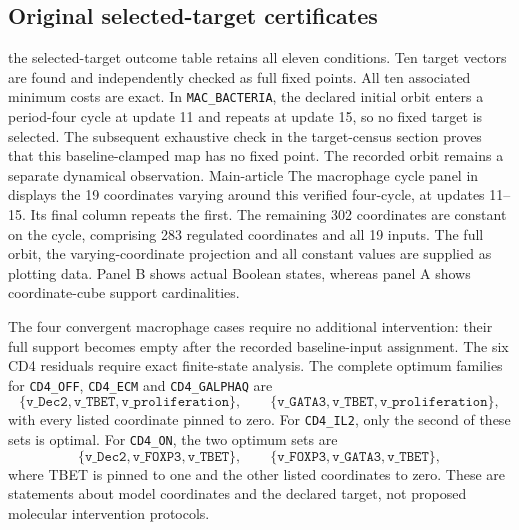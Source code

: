 \subsection{Original selected-target certificates}\label{sec:largeresults}
the selected-target outcome table retains all eleven conditions. Ten target
vectors are found and independently checked as full fixed points.
All ten associated minimum costs are exact. In \texttt{MAC\_BACTERIA},
the declared initial orbit enters a period-four cycle at update 11 and
repeats at update 15, so no fixed target is selected. The subsequent exhaustive check in the target-census section proves that this baseline-clamped map has no fixed point. The recorded orbit remains a separate dynamical observation.
Main-article The macrophage cycle panel in  displays the 19 coordinates varying around this
verified four-cycle, at updates 11--15. Its final column repeats the
first. The remaining 302 coordinates are constant on the cycle,
comprising 283 regulated coordinates and all 19 inputs. The full orbit,
the varying-coordinate projection and all constant values are supplied
as plotting data. Panel B shows actual Boolean states, whereas panel A
shows coordinate-cube support cardinalities.



The four convergent macrophage cases require no additional intervention:
their full support becomes empty after the recorded baseline-input
assignment. The six CD4 residuals require exact finite-state analysis.
The complete optimum families for \texttt{CD4\_OFF}, \texttt{CD4\_ECM}
and \texttt{CD4\_GALPHAQ} are
\[
 \{\texttt{v\_Dec2},\texttt{v\_TBET},\texttt{v\_proliferation}\},
 \qquad
 \{\texttt{v\_GATA3},\texttt{v\_TBET},\texttt{v\_proliferation}\},
\]
with every listed coordinate pinned to zero.
For \texttt{CD4\_IL2}, only the second of these sets is optimal.
For \texttt{CD4\_ON}, the two optimum sets are
\[
 \{\texttt{v\_Dec2},\texttt{v\_FOXP3},\texttt{v\_TBET}\},
 \qquad
 \{\texttt{v\_FOXP3},\texttt{v\_GATA3},\texttt{v\_TBET}\},
\]
where TBET is pinned to one and the other listed coordinates to zero.
These are statements about model coordinates and the declared target,
not proposed molecular intervention protocols.

